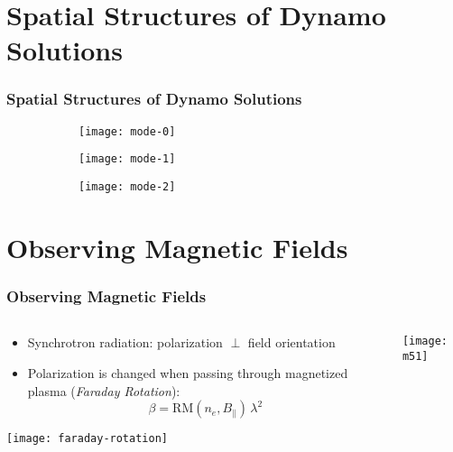 \documentclass[mathserif]{beamer}
\begin{document}
\section{Spatial Structures of Dynamo Solutions}
\begin{frame}
    \frametitle{Spatial Structures of Dynamo Solutions}

    \vspace{-\baselineskip}
    \begin{figure}
        \centering
        \begin{subfigure}[b]{.35\textwidth}
            \texttt{[image: mode-0]}
        \end{subfigure}
        \begin{subfigure}[b]{.35\textwidth}
            \texttt{[image: mode-1]}
        \end{subfigure}
        \begin{subfigure}[b]{.35\textwidth}
            \texttt{[image: mode-2]}
        \end{subfigure}
    \end{figure}

\end{frame}


\section{Observing Magnetic Fields}
\begin{frame}
    \frametitle{Observing Magnetic Fields}

    \begin{columns}[T]
        \begin{column}[T]{.5\textwidth}
            \begin{itemize}
                \item
                    Synchrotron radiation: polarization $\perp$ field
                    orientation
                \item
                    Polarization is changed when passing through magnetized
                    plasma (\emph{Faraday Rotation}):
                    \[\beta=\mathrm{RM}(n_e, B_{\parallel})\,\lambda^2\]
            \end{itemize}
            \texttt{[image: faraday-rotation]}
        \end{column}

        \begin{column}[T]{.5\textwidth}
            \pause
            \vspace{-\baselineskip}
            \texttt{[image: m51]}
        \end{column}
    \end{columns}

\end{frame}
\end{document}
